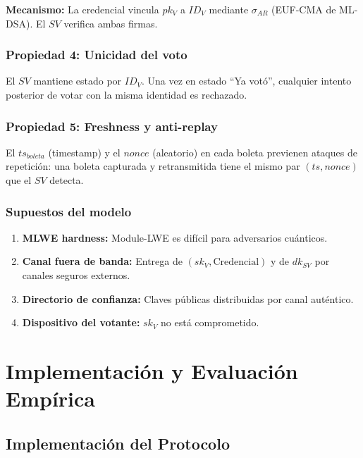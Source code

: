\documentclass[12pt,a4paper,twoside,openright]{book}
\theoremstyle{plain}
\theoremstyle{definition}
\theoremstyle{remark}
\begin{document}
\textbf{Mecanismo:} La credencial vincula $pk_V$ a $ID_V$ mediante
$\sigma_{AR}$ (EUF-CMA de ML-DSA). El $SV$ verifica ambas firmas.

\section{Propiedad 4: Unicidad del voto}

El $SV$ mantiene estado por $ID_V$. Una vez en estado ``Ya vot\'o'', cualquier
intento posterior de votar con la misma identidad es rechazado.

\section{Propiedad 5: Freshness y anti-replay}

El $ts_{\mathit{boleta}}$ (timestamp) y el $\mathit{nonce}$ (aleatorio) en
cada boleta previenen ataques de repetici\'on: una boleta capturada y
retransmitida tiene el mismo par $(ts, \mathit{nonce})$ que el $SV$ detecta.

\section{Supuestos del modelo}

\begin{enumerate}
  \item \textbf{MLWE hardness:} Module-LWE es dif\'icil para adversarios
    cu\'anticos.
  \item \textbf{Canal fuera de banda:} Entrega de $(sk_V, \text{Credencial})$
    y de $dk_{SV}$ por canales seguros externos.
  \item \textbf{Directorio de confianza:} Claves p\'ublicas distribuidas por
    canal aut\'entico.
  \item \textbf{Dispositivo del votante:} $sk_V$ no est\'a comprometido.
\end{enumerate}

\part{Implementaci\'on y Evaluaci\'on Emp\'irica}

\chapter{Implementaci\'on del Protocolo}
\label{chap:implementacion}
\end{document}
